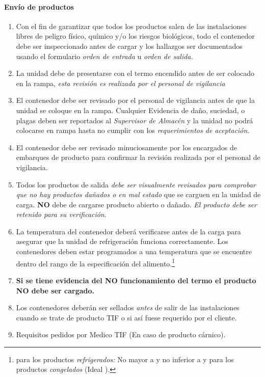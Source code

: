 \paragraph{Envío de productos}
\begin{enumerate}
	\item Con el fin de garantizar que todos los productos salen de las instalaciones libres de peligro físico, químico y/o los riesgos biológicos, todo el contenedor debe ser inspeccionado antes de cargar y los hallazgos ser documentados usando el formulario \emph{orden de entrada} u \emph{orden de salida.}
	\item La unidad debe de presentarse con el termo encendido antes de ser colocado en la rampa, \emph{esta revisión es realizada por el personal de vigilancia}
	\item El contenedor debe ser revisado por el personal de vigilancia antes de que la unidad se coloque en la rampa.
	Cualquier Evidencia de daño, suciedad, o plagas deben ser reportados al \emph{Supervisor de Almacén} y la unidad no podrá colocarse en rampa hasta no cumplir con los \emph{requerimientos de aceptación.}
	\item El contenedor debe ser revisado minuciosamente por los encargados de embarques de producto para confirmar la revisión realizada por el personal de vigilancia.
	\item Todos los productos de salida \emph{debe ser visualmente revisados para comprobar que no hay productos dañados o en mal estado} que se carguen en la unidad de carga. \textbf{NO} debe de cargarse producto abierto o dañado. \emph{El producto debe ser retenido para su verificación.}
	\item La temperatura del contenedor deberá verificarse antes de la carga para asegurar que la unidad de refrigeración funciona correctamente. Los contenedores deben estar programados a una temperatura que se encuentre dentro del rango de la especificación del \gls{alimento}.\footnote{para los productos \emph{refrigerados:} No mayor a  y no inferior a  y para los productos \emph{congelados}  (Ideal ).}
	\item \textbf{Si se tiene evidencia del NO funcionamiento del termo el producto NO debe ser cargado.}
	\item Los contenedores deberán ser sellados \emph{antes} de salir de las instalaciones cuando se trate de producto TIF o si así fuese requerido por el cliente.
	\item Requisitos pedidos por Medico TIF (En caso de producto cárnico).
\end{enumerate}

